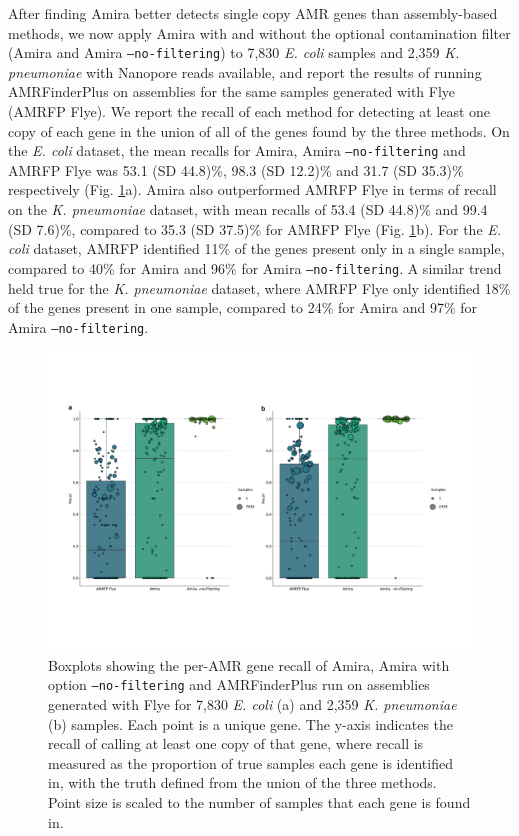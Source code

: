 After finding Amira better detects single copy AMR genes than assembly-based methods, we now apply Amira with and without the optional contamination filter (Amira and Amira \texttt{–no-filtering}) to 7,830 \textit{E. coli} samples and 2,359 \textit{K. pneumoniae} with Nanopore reads available, and report the results of running AMRFinderPlus on assemblies for the same samples generated with Flye (AMRFP Flye). We report the recall of each method for detecting at least one copy of each gene in the union of all of the genes found by the three methods. On the \textit{E. coli} dataset, the mean recalls for Amira, Amira \texttt{–no-filtering} and AMRFP Flye was 53.1 (SD 44.8)\%, 98.3 (SD 12.2)\% and 31.7 (SD 35.3)\% respectively (Fig. \ref{fig:5}a). Amira also outperformed AMRFP Flye in terms of recall on the \textit{K. pneumoniae} dataset, with mean recalls of 53.4 (SD 44.8)\% and 99.4 (SD 7.6)\%, compared to 35.3 (SD 37.5)\% for AMRFP Flye (Fig. \ref{fig:5}b). For the \textit{E. coli} dataset, AMRFP identified 11\% of the genes present only in a single sample, compared to 40\% for Amira and 96\% for Amira \texttt{–no-filtering}. A similar trend held true for the \textit{K. pneumoniae} dataset, where AMRFP Flye only identified 18\% of the genes present in one sample, compared to 24\% for Amira and 97\% for Amira \texttt{–no-filtering}.

\begin{figure}
\centering
\includegraphics[width=1\linewidth]{Figures/figure_5.pdf}
\caption{Boxplots showing the per-AMR gene recall of Amira, Amira with option \texttt{--no-filtering} and AMRFinderPlus run on assemblies generated with Flye for 7,830 \textit{E. coli} (a) and 2,359 \textit{K. pneumoniae} (b) samples. Each point is a unique gene. The y-axis indicates the recall of calling at least one copy of that gene, where recall is measured as the proportion of true samples each gene is identified in, with the truth defined from the union of the three methods. Point size is scaled to the number of samples that each gene is found in.}
\label{fig:5}
\end{figure}

